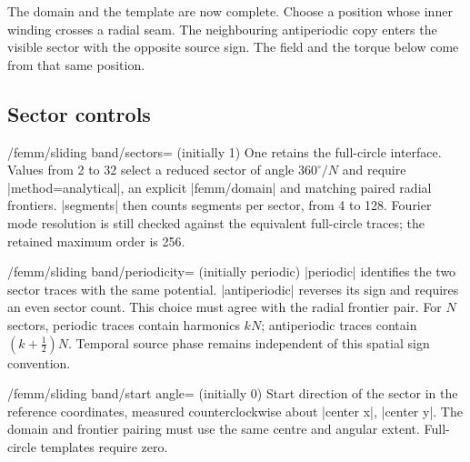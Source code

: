 The domain and the template are now complete. Choose a position whose inner
winding crosses a radial seam. The neighbouring antiperiodic copy enters the
visible sector with the opposite source sign. The field and the torque below
come from that same position.
\begin{codeexample}[]

\end{codeexample}

\subsection{Sector controls}
\begin{key}{/femm/sliding band/sectors= (initially 1)}
One retains the full-circle interface. Values from 2 to 32 select a reduced
sector of angle $360^\circ/N$ and require |method=analytical|, an explicit
|femm/domain| and matching paired radial frontiers. |segments| then counts
segments per sector, from 4 to 128. Fourier mode resolution is still checked
against the equivalent full-circle traces; the retained maximum order is 256.
\end{key}
\begin{key}{/femm/sliding band/periodicity= (initially periodic)}
|periodic| identifies the two sector traces with the same potential.
|antiperiodic| reverses its sign and requires an even sector count.
This choice must agree with the radial frontier pair. For $N$ sectors, periodic
traces contain harmonics $kN$; antiperiodic traces contain $(k+\tfrac12)N$.
Temporal source phase remains independent of this spatial sign convention.
\end{key}
\begin{key}{/femm/sliding band/start angle= (initially 0)}
Start direction of the sector in the reference coordinates, measured
counterclockwise about |center x|, |center y|. The domain and frontier pairing
must use the same centre and angular extent. Full-circle templates require zero.
\end{key}

